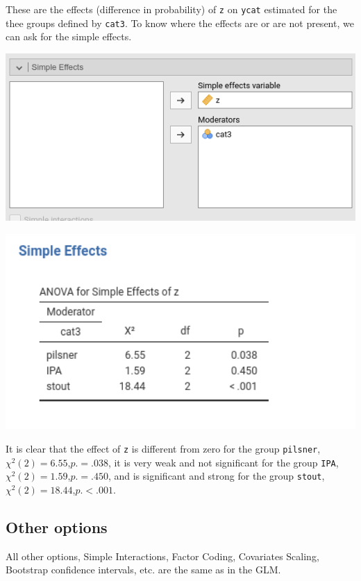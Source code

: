 \documentclass[
]{book}
\begin{document}
These are the effects (difference in probability) of \texttt{z} on \texttt{ycat} estimated for the thee groups defined by \texttt{cat3}. To know where the effects are or are not present, we can ask for the simple effects.

\includegraphics[width=7.65in]{bookletpics/3_multi_input3}

\includegraphics[width=5.6in]{bookletpics/3_multi_output10}

It is clear that the effect of \texttt{z} is different from zero for the group \texttt{pilsner}, \(\chi^2(2)=6.55\),\(p.=.038\), it is very weak and not significant for the group \texttt{IPA}, \(\chi^2(2)=1.59\),\(p.=.450\), and is significant and strong for the group \texttt{stout}, \(\chi^2(2)=18.44\),\(p.<.001\).

\hypertarget{other-options-1}{%
\subsection{Other options}\label{other-options-1}}

All other options, {Simple Interactions}, {Factor Coding}, {Covariates Scaling}, {Bootstrap} confidence intervals, etc. are the same as in the GLM.
\end{document}
